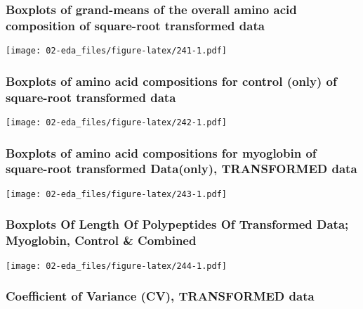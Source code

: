 \documentclass[]{article}
\begin{document}
\hypertarget{boxplots-of-grand-means-of-the-overall-amino-acid-composition-of-square-root-transformed-data}{%
\subsubsection{Boxplots of grand-means of the overall amino acid
composition of square-root transformed
data}\label{boxplots-of-grand-means-of-the-overall-amino-acid-composition-of-square-root-transformed-data}}

\texttt{[image: 02-eda\_files/figure-latex/241-1.pdf]}

\hypertarget{boxplots-of-amino-acid-compositions-for-control-only-of-square-root-transformed-data}{%
\subsubsection{Boxplots of amino acid compositions for control (only) of
square-root transformed
data}\label{boxplots-of-amino-acid-compositions-for-control-only-of-square-root-transformed-data}}

\texttt{[image: 02-eda\_files/figure-latex/242-1.pdf]}

\hypertarget{boxplots-of-amino-acid-compositions-for-myoglobin-of-square-root-transformed-dataonly-transformed-data}{%
\subsubsection{Boxplots of amino acid compositions for myoglobin of
square-root transformed Data(only), TRANSFORMED
data}\label{boxplots-of-amino-acid-compositions-for-myoglobin-of-square-root-transformed-dataonly-transformed-data}}

\texttt{[image: 02-eda\_files/figure-latex/243-1.pdf]}

\hypertarget{boxplots-of-length-of-polypeptides-of-transformed-data-myoglobin-control-combined}{%
\subsubsection{Boxplots Of Length Of Polypeptides Of Transformed Data;
Myoglobin, Control \&
Combined}\label{boxplots-of-length-of-polypeptides-of-transformed-data-myoglobin-control-combined}}

\texttt{[image: 02-eda\_files/figure-latex/244-1.pdf]}

\newpage

\hypertarget{coefficient-of-variance-cv-transformed-data}{%
\subsubsection{Coefficient of Variance (CV), TRANSFORMED
data}\label{coefficient-of-variance-cv-transformed-data}}
\end{document}
